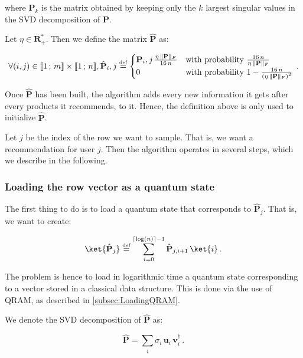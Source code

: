 \documentclass[11pt, a4paper]{article}
\begin{document}
            where \(\mathbf{P}_k\) is the matrix obtained by keeping only the \(k\) largest singular values in the SVD decomposition of \(\mathbf{P}\).
            
            Let \(\eta\in\mathbf{R}_+^*\). Then we define the matrix \(\hat{\mathbf{P}}\) as:
            
            \[\forall(i, j)\in\llbracket1\,;\,m\rrbracket\times\llbracket1\,;\,n\rrbracket,\hat{\mathbf{P}}_i,j\overset{\text{\tiny{def}}}{=}\begin{cases}\mathbf{P}_i,j\,\frac{\eta\,\|\mathbf{P}\|_F}{16\,n}&\text{with probability } \frac{16\,n}{\eta\,\|\mathbf{P}\|_F}\\0&\text{with probability } 1-\frac{16\,n}{\left(\eta\,\|\mathbf{P}\|_F\right)^2}\end{cases}\,.\]
            
            Once \(\hat{\mathbf{P}}\) has been built, the algorithm adds every new information it gets after every products it recommends, to it. Hence, the definition above is only used to initialize \(\hat{\mathbf{P}}\).
            
            Let \(j\) be the index of the row we want to sample. That is, we want a recommendation for user \(j\). Then the algorithm operates in several steps, which we describe in the following.
            
            \subsubsection{Loading the row vector as a quantum state}
                \label{subsubsec:Loading}
                The first thing to do is to load a quantum state that corresponds to \(\hat{\mathbf{P}}_j\). That is, we want to create:
                
                \[\ket{\hat{\mathbf{P}}_j} \overset{\text{\tiny{def}}}{=} \sum_{i=0}^{\lceil\log(n)\rceil-1}\hat{\mathbf{P}}_{j,i + 1}\,\ket{i}\,.\]
                
                The problem is hence to load in logarithmic time a quantum state corresponding to a vector stored in a classical data structure. This is done via the use of QRAM, as described in \autoref{subsec:LoadingQRAM}.
                
                We denote the SVD decomposition of \(\hat{\mathbf{P}}\) as:
                
                \[\hat{\mathbf{P}} = \sum_{i}\sigma_i\,\mathbf{u}_i\,\mathbf{v}_i^\dagger\,.\]
                
\end{document}
